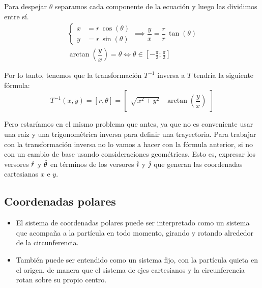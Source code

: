 \documentclass[a5paper,12pt,twoside]{book}
\begin{document}
Para despejar $\theta$ separamos cada componente de la ecuación y luego las dividimos entre sí.
\begin{gather*}
  \left\{
    \begin{aligned}
      x &= r \, \cos{(\theta)}
      \\
      y &= r \, \sin{(\theta)}
    \end{aligned}
  \right.
  \implies
  \dfrac{y}{x} = \dfrac{r}{r} \, \tan{(\theta)}
  \\
  \arctan{\left( \dfrac{y}{x} \right)} = \theta \iff \theta \in \left[ -\tfrac{\pi}{2};\tfrac{\pi}{2} \right]
\end{gather*}

Por lo tanto, tenemos que la transformación $T^{-1}$ inversa a $T$ tendría la siguiente fórmula:
\[
  T^{-1} (x,y) = [r,\theta] =
  \begin{bmatrix}
      \sqrt{x^2 + y^2} & \arctan{\left( \dfrac{y}{x} \right)} 
  \end{bmatrix}
\]

Pero estaríamos en el mismo problema que antes, ya que no es conveniente usar una raíz y una trigonométrica inversa para definir una trayectoria.
Para trabajar con la transformación inversa no lo vamos a hacer con la fórmula anterior, si no con un cambio de base usando consideraciones geométricas.
Esto es, expresar los versores $\hat{r}$ y $\hat{\theta}$ en términos de los versores $\hat{\imath}$ y $\hat{\jmath}$ que generan las coordenadas cartesianas $x$ e $y$.

\subsection{Coordenadas polares}
\label{A:polarCoordinates}

\begin{center}
    \def\svgwidth{0.7\linewidth}
    
\end{center}

\begin{itemize}
  \item El sistema de coordenadas polares puede ser interpretado como un sistema que acompaña a la partícula en todo momento, girando y rotando alrededor de la circunferencia.
  \item También puede ser entendido como un sistema fijo, con la partícula quieta en el origen, de manera que el sistema de ejes cartesianos y la circunferencia rotan sobre su propio centro.
\end{itemize}
\end{document}

